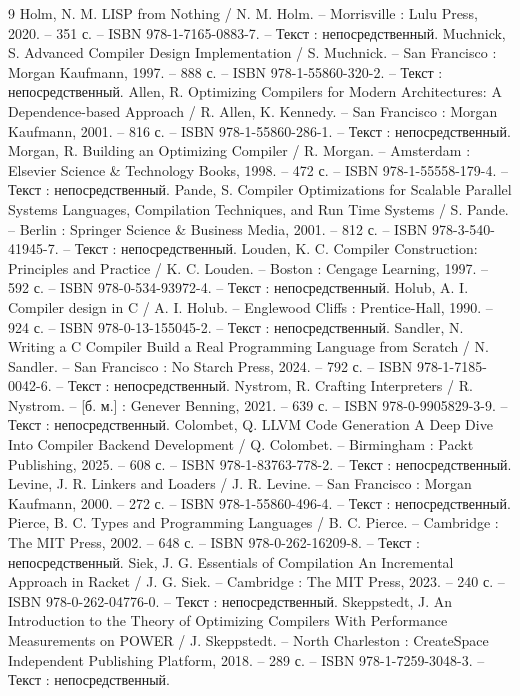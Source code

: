 \begin{thebibliography}{9}
 Holm, N. M. LISP from Nothing / N. M. Holm. -- Morrisville : Lulu Press, 2020. -- 351 с. -- ISBN 978-1-7165-0883-7. -- Текст : непосредственный.
 Muchnick, S. Advanced Compiler Design Implementation / S. Muchnick. -- San Francisco : Morgan Kaufmann, 1997. -- 888 с. -- ISBN 978-1-55860-320-2. -- Текст : непосредственный.
 Allen, R. Optimizing Compilers for Modern Architectures: A Dependence-based Approach / R. Allen, K. Kennedy. -- San Francisco : Morgan Kaufmann, 2001. -- 816 с. -- ISBN 978-1-55860-286-1. -- Текст : непосредственный.
 Morgan, R. Building an Optimizing Compiler / R. Morgan. -- Amsterdam : Elsevier Science \& Technology Books, 1998. -- 472 с. -- ISBN 978-1-55558-179-4. -- Текст : непосредственный.
 Pande, S. Compiler Optimizations for Scalable Parallel Systems Languages, Compilation Techniques, and Run Time Systems / S. Pande. -- Berlin : Springer Science \& Business Media, 2001. -- 812 с. -- ISBN 978-3-540-41945-7. -- Текст : непосредственный.
 Louden, K. C. Compiler Construction: Principles and Practice / K. C. Louden. -- Boston : Cengage Learning, 1997. -- 592 с. -- ISBN 978-0-534-93972-4. -- Текст : непосредственный.
 Holub, A. I. Compiler design in C / A. I. Holub. -- Englewood Cliffs : Prentice-Hall, 1990. -- 924 с. -- ISBN 978-0-13-155045-2. -- Текст : непосредственный.
 Sandler, N. Writing a C Compiler Build a Real Programming Language from Scratch / N. Sandler. -- San Francisco : No Starch Press, 2024. -- 792 с. -- ISBN 978-1-7185-0042-6. -- Текст : непосредственный.
 Nystrom, R. Crafting Interpreters / R. Nystrom. -- [б. м.] : Genever Benning, 2021. -- 639 с. -- ISBN 978-0-9905829-3-9. -- Текст : непосредственный.
 Colombet, Q. LLVM Code Generation A Deep Dive Into Compiler Backend Development / Q. Colombet. -- Birmingham : Packt Publishing, 2025. -- 608 с. -- ISBN 978-1-83763-778-2. -- Текст : непосредственный.
 Levine, J. R. Linkers and Loaders / J. R. Levine. -- San Francisco : Morgan Kaufmann, 2000. -- 272 с. -- ISBN 978-1-55860-496-4. -- Текст : непосредственный.
 Pierce, B. C. Types and Programming Languages / B. C. Pierce. -- Cambridge : The MIT Press, 2002. -- 648 с. -- ISBN 978-0-262-16209-8. -- Текст : непосредственный.
 Siek, J. G. Essentials of Compilation An Incremental Approach in Racket / J. G. Siek. -- Cambridge : The MIT Press, 2023. -- 240 с. -- ISBN 978-0-262-04776-0. -- Текст : непосредственный.
 Skeppstedt, J. An Introduction to the Theory of Optimizing Compilers With Performance Measurements on POWER / J. Skeppstedt. -- North Charleston : CreateSpace Independent Publishing Platform, 2018. -- 289 с. -- ISBN 978-1-7259-3048-3. -- Текст : непосредственный.

\end{thebibliography}
